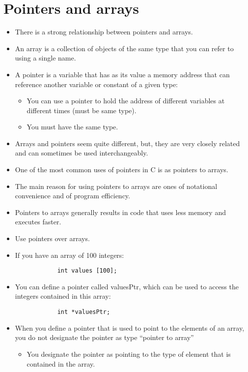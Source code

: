 \section{Pointers and arrays}
\begin{itemize}
    \item There is a strong relationship between pointers and arrays. 
    \item An array is a collection of objects of the same type that you can refer to using a single name. 
    
    \item A pointer is a variable that has as its value a memory address that can reference another variable or constant of a given type: 
        \begin{itemize}
            \item You can use a pointer to hold the address of different variables at different times (must be same type).
            \item You must have the same type. 
        \end{itemize}
    
    \item Arrays and pointers seem quite different, but, they are very closely related and can sometimes be used interchangeably. 
    \item One of the most common uses of pointers in C is as pointers to arrays. 
    \item The main reason for using pointers to arrays are ones of notational convenience and of program efficiency. 
    \item Pointers to arrays generally results in code that uses less memory and executes faster. 
    \item Use pointers over arrays. 
    \item If you have an array of 100 integers:
        \begin{verbatim}
            int values [100];
        \end{verbatim}
    
    \item You can define a pointer called valuesPtr, which can be used to access the integers contained in this array: 
        \begin{verbatim}
            int *valuesPtr;
        \end{verbatim}
    
    \item When you define a pointer that is used to point to the elements of an array, you do not designate the pointer as type ``pointer to array''
        \begin{itemize}
            \item You designate the pointer as pointing to the type of element that is contained in the array. 
        \end{itemize}
    

\end{itemize}
